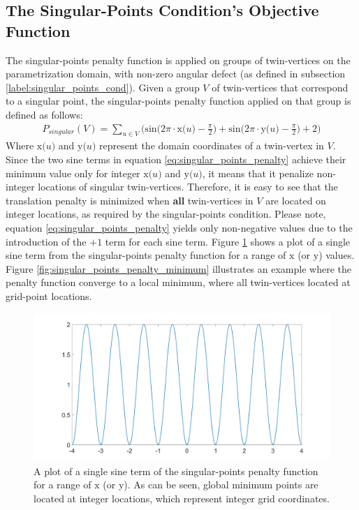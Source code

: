 \subsection{The Singular-Points Condition's Objective Function}
The singular-points penalty function is applied on groups of twin-vertices on the parametrization domain, with non-zero angular defect (as defined in subsection \ref{label:singular_points_cond}). Given a group $V$ of twin-vertices that correspond to a singular point, the singular-points penalty function applied on that group is defined as follows:
\begin{equation}\label{eq:singular_points_penalty}
\begin{split}
P_{singular}\left(V\right) = \sum_{u \in V} \bigg( \mathrm{sin} \Big( 2\pi\cdot\mathrm{x}\big(u\big) - \frac{\pi}{2}\Big) + \mathrm{sin} \Big( 2\pi\cdot\mathrm{y}\big(u\big) - \frac{\pi}{2}\Big) + 2 \bigg)
\end{split}
\end{equation}
Where $\mathrm{x}\big(u\big)$ and $\mathrm{y}\big(u\big)$ represent the domain coordinates of a twin-vertex in $V$. Since the two sine terms in equation \ref{eq:singular_points_penalty} achieve their minimum value only for integer $\mathrm{x}\big(u\big)$ and $\mathrm{y}\big(u\big)$, it means that it penalize non-integer locations of singular twin-vertices. Therefore, it is easy to see that the translation penalty is minimized when \textbf{all} twin-vertices in $V$ are located on integer locations, as required by the singular-points condition. Please note, equation \ref{eq:singular_points_penalty} yields only non-negative values due to the introduction of the $+1$ term for each sine term. Figure \ref{fig:singular_points_penalty_sine_term} shows a plot of a single sine term from the singular-points penalty function for a range of $\mathrm{x}$ (or $\mathrm{y}$) values. Figure \ref{fig:singular_points_penalty_minimum} illustrates an example where the penalty function converge to a local minimum, where all twin-vertices located at grid-point locations.
\begin{figure}[ht]
\centering
\includegraphics[width=16cm]{figures/singular_points/singular_points_penalty_function_sine_term.png}
\caption[The Singular-Points Penalty Function (Single Sine Term)]{A plot of a single sine term of the singular-points penalty function for a range of $\mathrm{x}$ (or $\mathrm{y}$). As can be seen, global minimum points are located at integer locations, which represent integer grid coordinates.}
\label{fig:singular_points_penalty_sine_term}
\end{figure}
